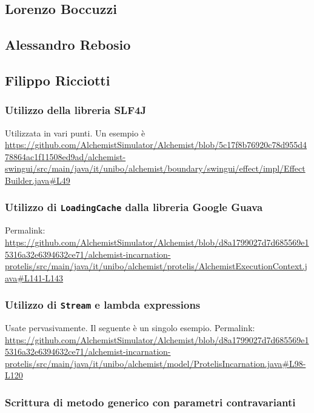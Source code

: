 \documentclass[a4paper,12pt]{report}
\begin{document}
\subsection{Lorenzo Boccuzzi}

\subsection{Alessandro Rebosio}

\subsection{Filippo Ricciotti}

\subsubsection{Utilizzo della libreria SLF4J}

Utilizzata in vari punti.
Un esempio è \url{https://github.com/AlchemistSimulator/Alchemist/blob/5c17f8b76920c78d955d478864ac1f11508ed9ad/alchemist-swingui/src/main/java/it/unibo/alchemist/boundary/swingui/effect/impl/EffectBuilder.java#L49}

\subsubsection{Utilizzo di \texttt{LoadingCache} dalla libreria Google Guava}

Permalink: \url{https://github.com/AlchemistSimulator/Alchemist/blob/d8a1799027d7d685569e15316a32e6394632ce71/alchemist-incarnation-protelis/src/main/java/it/unibo/alchemist/protelis/AlchemistExecutionContext.java#L141-L143}

\subsubsection{Utilizzo di \texttt{Stream} e lambda expressions}

Usate pervasivamente. Il seguente è un singolo esempio.
Permalink: \url{https://github.com/AlchemistSimulator/Alchemist/blob/d8a1799027d7d685569e15316a32e6394632ce71/alchemist-incarnation-protelis/src/main/java/it/unibo/alchemist/model/ProtelisIncarnation.java#L98-L120}

\subsubsection{Scrittura di metodo generico con parametri contravarianti}
\end{document}
